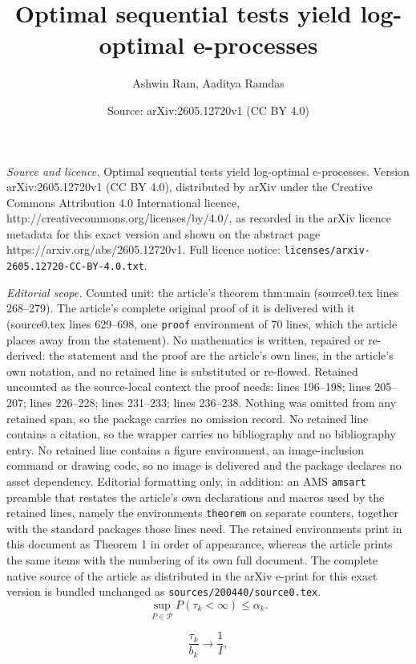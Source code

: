 \documentclass[10pt,a4paper]{amsart}
\title{Optimal sequential tests yield log-optimal e-processes}
\author{Ashwin Ram, Aaditya Ramdas}
\date{Source: arXiv:2605.12720v1 (CC BY 4.0)}
\begin{document}
\maketitle

\noindent\emph{Source and licence.} Optimal sequential tests yield log-optimal e-processes. Version arXiv:2605.12720v1 (CC BY 4.0), distributed by arXiv under the Creative Commons Attribution 4.0 International licence, http://creativecommons.org/licenses/by/4.0/, as recorded in the arXiv licence metadata for this exact version and shown on the abstract page https://arxiv.org/abs/2605.12720v1. Full licence notice: \texttt{licenses/arxiv-2605.12720-CC-BY-4.0.txt}.\par\smallskip

\noindent\textit{Editorial scope.} Counted unit: the article's theorem thm:main (source0.tex lines 268--279). The article's complete original proof of it is delivered with it (source0.tex lines 629--698, one \texttt{proof} environment of 70 lines, which the article places away from the statement). No mathematics is written, repaired or re-derived: the statement and the proof are the article's own lines, in the article's own notation, and no retained line is substituted or re-flowed.  Retained uncounted as the source-local context the proof needs: lines 196--198; lines 205--207; lines 226--228; lines 231--233; lines 236--238.  Nothing was omitted from any retained span, so the package carries no omission record.  No retained line contains a citation, so the wrapper carries no bibliography and no bibliography entry.  No retained line contains a figure environment, an image-inclusion command or drawing code, so no image is delivered and the package declares no asset dependency.  Editorial formatting only, in addition: an AMS \texttt{amsart} preamble that restates the article's own declarations and macros used by the retained lines, namely the environments \texttt{theorem} on separate counters, together with the standard packages those lines need.  The retained environments print in this document as Theorem 1 in order of appearance, whereas the article prints the same items with the numbering of its own full document.  The complete native source of the article as distributed in the arXiv e-print for this exact version is bundled unchanged as \texttt{sources/200440/source0.tex}.
\begin{equation}\label{eq:V}
\sup_{P\in\mathcal P} P(\tau_k<\infty)\le \alpha_k.
\end{equation}

\begin{equation}\label{eq:AO}
\frac{\tau_k}{b_k}\longrightarrow \frac{1}{I},
\end{equation}
\end{document}
